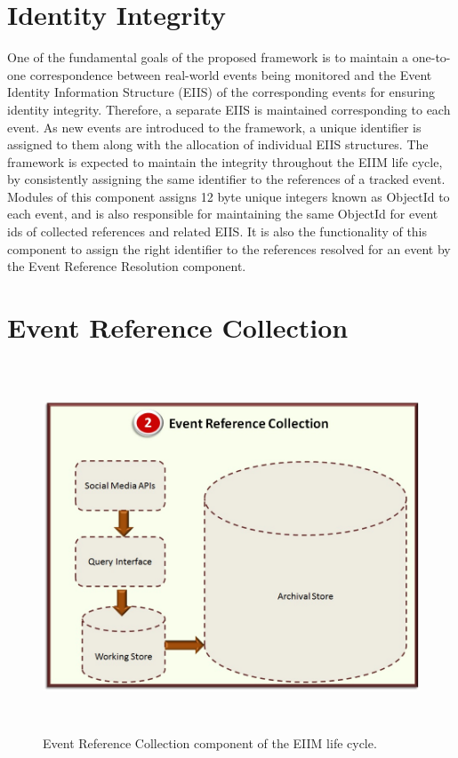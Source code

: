 \section{Identity Integrity}
One of the fundamental goals of the proposed framework is to maintain a one-to-one correspondence between real-world events being monitored and the Event Identity Information Structure (EIIS) of the corresponding events for ensuring identity integrity. Therefore, a separate EIIS is maintained corresponding to each event. As new events are introduced to the framework, a unique identifier is assigned to them along with the allocation of individual EIIS structures. The framework is expected to maintain the integrity throughout the EIIM life cycle, by consistently assigning the same identifier to the references of a tracked event. Modules of this component assigns 12 byte unique integers known as ObjectId  to each event, and is also responsible for maintaining the same ObjectId for event ids of collected references and related EIIS. It is also the functionality of this component to assign the right identifier to the references resolved for an event by the Event Reference Resolution component.


\section{Event Reference Collection\label{eventreferencecollection}}

\begin{figure}[htbp]
  \caption{Event Reference Collection component of the EIIM life cycle.}
  \centering
    \includegraphics[width=14cm,height=11cm]{Figures/EIIMComponents/EventReferenceCollection.jpg}
\end{figure}

